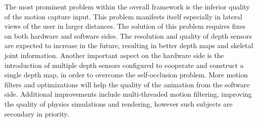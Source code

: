 The most prominent problem within the overall framework is the inferior quality of the motion capture input. This problem manifests itself especially in lateral views of the user in larger distances. The solution of this problem requires fixes on both hardware and software sides. The resolution and quality of depth sensors are expected to increase in the future, resulting in better depth maps and skeletal joint information. Another important aspect on the hardware side is the introduction of multiple depth sensors configured to cooperate and construct a single depth map, in order to overcome the self-occlusion problem. More motion filters and optimizations will help the quality of the animation from the software side. Additional improvements include multi-threaded motion filtering, improving the quality of physics simulations and rendering, however such subjects are secondary in priority.  

